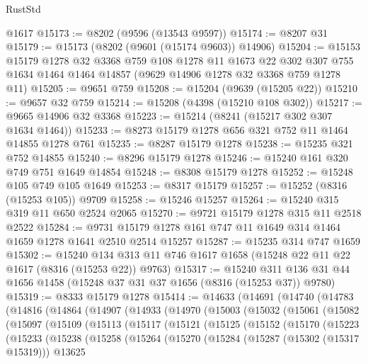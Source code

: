 \begin{lexlean}{RustStd}
\begin{coremodule}
    @1617
@15173 := @8202 (@9596 (@13543 @9597))
@15174 := @8207 @31
@15179 := @15173 (@8202 (@9601 (@15174 @9603)) @14906)
@15204 := @15153
    @15179
    @1278
    @32
    @3368
    @759
    @108
    @1278
    @11
    @1673
    @22
    @302
    @307
    @755
    @1634
    @1464
    @1464
    @14857
    (@9629 @14906 @1278 @32 @3368 @759 @1278 @11)
@15205 := @9651 @759
@15208 := @15204 (@9639 (@15205 @22))
@15210 := @9657 @32 @759
@15214 := @15208 (@4398 (@15210 @108 @302))
@15217 := @9665 @14906 @32 @3368
@15223 := @15214 (@8241 (@15217 @302 @307 @1634 @1464))
@15233 := @8273 @15179 @1278 @656 @321 @752 @11 @1464 @14855 @1278 @761
@15235 := @8287 @15179 @1278
@15238 := @15235 @321 @752 @14855
@15240 := @8296 @15179 @1278
@15246 := @15240 @161 @320 @749 @751 @1649 @14854
@15248 := @8308 @15179 @1278
@15252 := @15248 @105 @749 @105 @1649
@15253 := @8317 @15179
@15257 := @15252 (@8316 (@15253 @105)) @9709
@15258 := @15246 @15257
@15264 := @15240 @315 @319 @11 @650 @2524 @2065
@15270 := @9721 @15179 @1278 @315 @11 @2518 @2522
@15284 := @9731 @15179 @1278 @161 @747 @11 @1649 @314 @1464 @1659 @1278 @1641 @2510 @2514 @15257
@15287 := @15235 @314 @747 @1659
@15302 := @15240
    @134
    @313
    @11
    @746
    @1617
    @1658
    (@15248 @22 @11 @22 @1617 (@8316 (@15253 @22)) @9763)
@15317 := @15240 @311 @136 @31 @44 @1656 @1458 (@15248 @37 @31 @37 @1656 (@8316 (@15253 @37)) @9780)
@15319 := @8333 @15179 @1278
@15414 := @14633
    (@14691
      (@14740
        (@14783
          (@14816
            (@14864
              (@14907
                (@14933
                  (@14970
                    (@15003
                      (@15032
                        (@15061
                          (@15082
                            (@15097
                              (@15109
                                (@15113
                                  (@15117
                                    (@15121
                                      (@15125
                                        (@15152
                                          (@15170
                                            (@15223
                                              (@15233
                                                (@15238
                                                  (@15258
                                                    (@15264
                                                      (@15270
                                                        (@15284
                                                          (@15287 (@15302 (@15317 @15319)))
                                                          @13625

\end{coremodule}
\end{lexlean}
